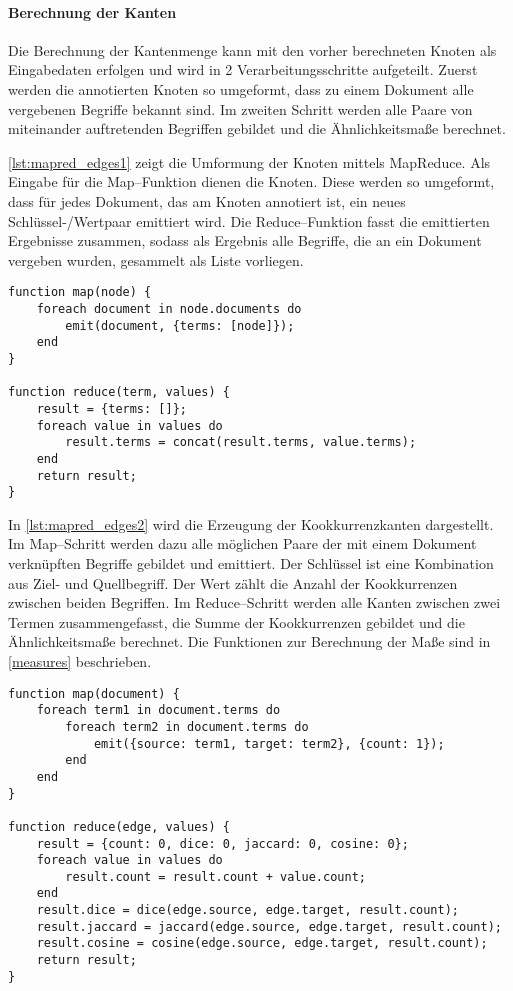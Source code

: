 \paragraph{Berechnung der Kanten}

Die Berechnung der Kantenmenge kann mit den vorher berechneten Knoten als Eingabedaten erfolgen und wird in 2 Verarbeitungsschritte aufgeteilt. Zuerst werden die annotierten Knoten so umgeformt, dass zu einem Dokument alle vergebenen Begriffe bekannt sind. Im zweiten Schritt werden alle Paare von miteinander auftretenden Begriffen gebildet und die Ähnlichkeitsmaße berechnet.

\cref{lst:mapred_edges1} zeigt die Umformung der Knoten mittels MapReduce. Als Eingabe für die Map--Funktion dienen die Knoten. Diese werden so umgeformt, dass für jedes Dokument, das am Knoten annotiert ist, ein neues Schlüssel-/Wertpaar emittiert wird. Die Reduce--Funktion fasst die emittierten Ergebnisse zusammen, sodass als Ergebnis alle Begriffe, die an ein Dokument vergeben wurden, gesammelt als Liste vorliegen.

\begin{lstlisting}[language=pseudo, label={lst:mapred_edges1}, caption={Umformung der Knoten mit MapReduce}, float]
function map(node) {
    foreach document in node.documents do
        emit(document, {terms: [node]});
    end
}

function reduce(term, values) {
    result = {terms: []};
    foreach value in values do
        result.terms = concat(result.terms, value.terms);
    end
    return result;
}
\end{lstlisting}

In \cref{lst:mapred_edges2} wird die Erzeugung der Kookkurrenzkanten dargestellt. Im Map--Schritt werden dazu alle möglichen Paare der mit einem Dokument verknüpften Begriffe gebildet und emittiert. Der Schlüssel ist eine Kombination aus Ziel- und Quellbegriff. Der Wert zählt die Anzahl der Kookkurrenzen zwischen beiden Begriffen. Im Reduce--Schritt werden alle Kanten zwischen zwei Termen zusammengefasst, die Summe der Kookkurrenzen gebildet und die Ähnlichkeitsmaße berechnet. Die Funktionen zur Berechnung der Maße sind in \cref{measures} beschrieben.

\begin{lstlisting}[language=pseudo, label={lst:mapred_edges2}, caption={Kantenerzeugung mit MapReduce}, float]
function map(document) {
    foreach term1 in document.terms do
        foreach term2 in document.terms do
            emit({source: term1, target: term2}, {count: 1});
        end
    end
}

function reduce(edge, values) {
    result = {count: 0, dice: 0, jaccard: 0, cosine: 0};
    foreach value in values do
        result.count = result.count + value.count;
    end
    result.dice = dice(edge.source, edge.target, result.count);
    result.jaccard = jaccard(edge.source, edge.target, result.count);
    result.cosine = cosine(edge.source, edge.target, result.count);
    return result;
}
\end{lstlisting}

